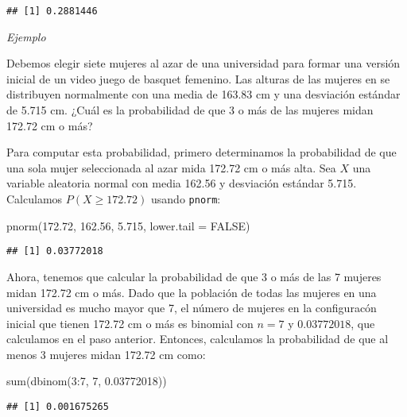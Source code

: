 \documentclass[
]{article}
\newenvironment{Shaded}{\begin{snugshade}}{\end{snugshade}}
\newcommand{\AttributeTok}[1]{\textcolor[rgb]{0.77,0.63,0.00}{#1}}
\newcommand{\ConstantTok}[1]{\textcolor[rgb]{0.00,0.00,0.00}{#1}}
\newcommand{\DecValTok}[1]{\textcolor[rgb]{0.00,0.00,0.81}{#1}}
\newcommand{\FloatTok}[1]{\textcolor[rgb]{0.00,0.00,0.81}{#1}}
\newcommand{\FunctionTok}[1]{\textcolor[rgb]{0.00,0.00,0.00}{#1}}
\newcommand{\NormalTok}[1]{#1}
\newcommand{\SpecialCharTok}[1]{\textcolor[rgb]{0.00,0.00,0.00}{#1}}
\begin{document}
\begin{verbatim}
## [1] 0.2881446
\end{verbatim}

\emph{Ejemplo}

Debemos elegir siete mujeres al azar de una universidad para formar una
versión inicial de un video juego de basquet femenino. Las alturas de
las mujeres en se distribuyen normalmente con una media de 163.83 cm y
una desviación estándar de 5.715 cm. ¿Cuál es la probabilidad de que 3 o
más de las mujeres midan 172.72 cm o más?

Para computar esta probabilidad, primero determinamos la probabilidad de
que una sola mujer seleccionada al azar mida 172.72 cm o más alta. Sea
\(X\) una variable aleatoria normal con media 162.56 y desviación
estándar 5.715. Calculamos \(P(X \ge 172.72)\) usando \texttt{pnorm}:

\begin{Shaded}
\begin{Highlighting}[]
\FunctionTok{pnorm}\NormalTok{(}\FloatTok{172.72}\NormalTok{, }\FloatTok{162.56}\NormalTok{, }\FloatTok{5.715}\NormalTok{, }\AttributeTok{lower.tail =} \ConstantTok{FALSE}\NormalTok{)}
\end{Highlighting}
\end{Shaded}

\begin{verbatim}
## [1] 0.03772018
\end{verbatim}

Ahora, tenemos que calcular la probabilidad de que 3 o más de las 7
mujeres midan 172.72 cm o más. Dado que la población de todas las
mujeres en una universidad es mucho mayor que 7, el número de mujeres en
la configuracón inicial que tienen 172.72 cm o más es binomial con
\(n = 7\) y \(0.03772018\), que calculamos en el paso anterior.
Entonces, calculamos la probabilidad de que al menos 3 mujeres midan
172.72 cm como:

\begin{Shaded}
\begin{Highlighting}[]
\FunctionTok{sum}\NormalTok{(}\FunctionTok{dbinom}\NormalTok{(}\DecValTok{3}\SpecialCharTok{:}\DecValTok{7}\NormalTok{, }\DecValTok{7}\NormalTok{, }\FloatTok{0.03772018}\NormalTok{))}
\end{Highlighting}
\end{Shaded}

\begin{verbatim}
## [1] 0.001675265
\end{verbatim}
\end{document}
